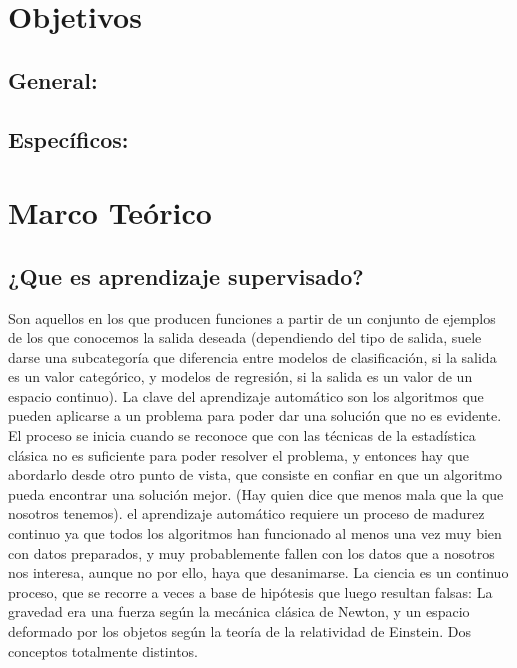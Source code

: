 \documentclass[%
 reprint,
 amsmath,amssymb,
 aps,
]{revtex4-1}
\begin{document}
{ 
\section{Objetivos}\label{sec:2}
\subsection{General:}


\subsection{Específicos:}



\section {Marco Teórico}

\subsection{¿Que es aprendizaje supervisado?}	
 Son aquellos en los que producen funciones a partir de un conjunto de ejemplos de los que conocemos la salida deseada (dependiendo del tipo de salida, suele darse una subcategoría que diferencia entre modelos de clasificación, si la salida es un valor categórico, y modelos de regresión, si la salida es un valor de un espacio continuo).
La clave del aprendizaje automático son los algoritmos que pueden aplicarse a un
problema para poder dar una solución que no es evidente. El proceso se inicia cuando se reconoce
que con las técnicas de la estadística clásica no es suficiente para poder resolver el problema, y
entonces hay que abordarlo desde otro punto de vista, que consiste en confiar en que un algoritmo
pueda encontrar una solución mejor. (Hay quien dice que menos mala que la que nosotros tenemos).
el aprendizaje automático requiere un proceso de madurez continuo ya que todos
los algoritmos han funcionado al menos una vez muy bien con datos preparados, y muy
probablemente fallen con los datos que a nosotros nos interesa, aunque no por ello, haya que
desanimarse. La ciencia es un continuo proceso, que se recorre a veces a base de hipótesis que luego
resultan falsas: La gravedad era una fuerza según la mecánica clásica de Newton, y un espacio
deformado por los objetos según la teoría de la relatividad de Einstein. Dos conceptos totalmente
distintos.


}
\end{document}
